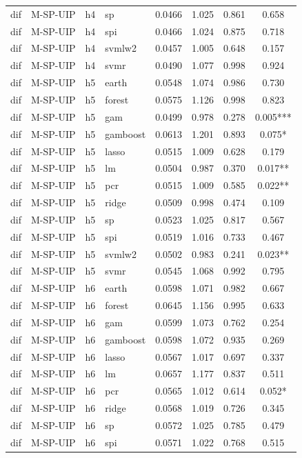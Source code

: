 \begin{ThreePartTable}
\begin{longtable}[t]{llclcccc}
dif & M-SP-UIP & h4 & sp & 0.0466 & 1.025 & 0.861 & 0.658\\
dif & M-SP-UIP & h4 & spi & 0.0466 & 1.024 & 0.875 & 0.718\\
dif & M-SP-UIP & h4 & svmlw2 & 0.0457 & 1.005 & 0.648 & 0.157\\
dif & M-SP-UIP & h4 & svmr & 0.0490 & 1.077 & 0.998 & 0.924\\
\addlinespace
dif & M-SP-UIP & h5 & earth & 0.0548 & 1.074 & 0.986 & 0.730\\
dif & M-SP-UIP & h5 & forest & 0.0575 & 1.126 & 0.998 & 0.823\\
dif & M-SP-UIP & h5 & gam & 0.0499 & 0.978 & 0.278 & 0.005***\\
dif & M-SP-UIP & h5 & gamboost & 0.0613 & 1.201 & 0.893 & 0.075*\\
dif & M-SP-UIP & h5 & lasso & 0.0515 & 1.009 & 0.628 & 0.179\\
dif & M-SP-UIP & h5 & lm & 0.0504 & 0.987 & 0.370 & 0.017**\\
dif & M-SP-UIP & h5 & pcr & 0.0515 & 1.009 & 0.585 & 0.022**\\
dif & M-SP-UIP & h5 & ridge & 0.0509 & 0.998 & 0.474 & 0.109\\
dif & M-SP-UIP & h5 & sp & 0.0523 & 1.025 & 0.817 & 0.567\\
dif & M-SP-UIP & h5 & spi & 0.0519 & 1.016 & 0.733 & 0.467\\
dif & M-SP-UIP & h5 & svmlw2 & 0.0502 & 0.983 & 0.241 & 0.023**\\
dif & M-SP-UIP & h5 & svmr & 0.0545 & 1.068 & 0.992 & 0.795\\
\addlinespace
dif & M-SP-UIP & h6 & earth & 0.0598 & 1.071 & 0.982 & 0.667\\
dif & M-SP-UIP & h6 & forest & 0.0645 & 1.156 & 0.995 & 0.633\\
dif & M-SP-UIP & h6 & gam & 0.0599 & 1.073 & 0.762 & 0.254\\
dif & M-SP-UIP & h6 & gamboost & 0.0598 & 1.072 & 0.935 & 0.269\\
dif & M-SP-UIP & h6 & lasso & 0.0567 & 1.017 & 0.697 & 0.337\\
dif & M-SP-UIP & h6 & lm & 0.0657 & 1.177 & 0.837 & 0.511\\
dif & M-SP-UIP & h6 & pcr & 0.0565 & 1.012 & 0.614 & 0.052*\\
dif & M-SP-UIP & h6 & ridge & 0.0568 & 1.019 & 0.726 & 0.345\\
dif & M-SP-UIP & h6 & sp & 0.0572 & 1.025 & 0.785 & 0.479\\
dif & M-SP-UIP & h6 & spi & 0.0571 & 1.022 & 0.768 & 0.515\\

\end{longtable}
\end{ThreePartTable}
